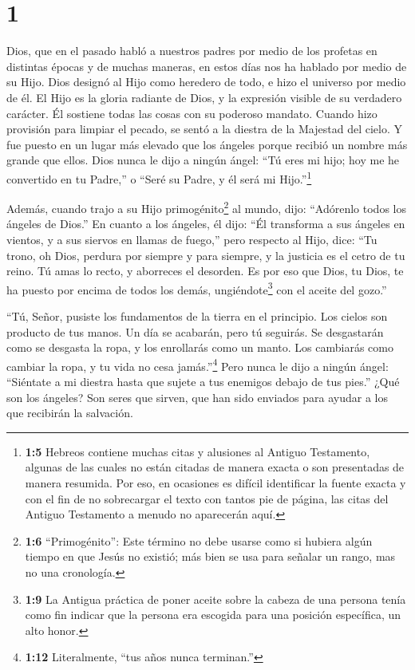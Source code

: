 \hypertarget{section}{%
\section{1}\label{section}}

 Dios, que en el pasado habló a nuestros padres por medio de
los profetas en distintas épocas y de muchas maneras,  en
estos días nos ha hablado por medio de su Hijo. Dios designó al Hijo
como heredero de todo, e hizo el universo por medio de él. 
El Hijo es la gloria radiante de Dios, y la expresión visible de su
verdadero carácter. Él sostiene todas las cosas con su poderoso mandato.
Cuando hizo provisión para limpiar el pecado, se sentó a la diestra de
la Majestad del cielo.  Y fue puesto en un lugar más elevado
que los ángeles porque recibió un nombre más grande que ellos.
 Dios nunca le dijo a ningún ángel: ``Tú eres mi hijo; hoy
me he convertido en tu Padre,'' o ``Seré su Padre, y él será mi
Hijo.''\footnote{\textbf{1:5} Hebreos contiene muchas citas y alusiones
  al Antiguo Testamento, algunas de las cuales no están citadas de
  manera exacta o son presentadas de manera resumida. Por eso, en
  ocasiones es difícil identificar la fuente exacta y con el fin de no
  sobrecargar el texto con tantos pie de página, las citas del Antiguo
  Testamento a menudo no aparecerán aquí.}

 Además, cuando trajo a su Hijo primogénito\footnote{\textbf{1:6}
  ``Primogénito'': Este término no debe usarse como si hubiera algún
  tiempo en que Jesús no existió; más bien se usa para señalar un rango,
  mas no una cronología.} al mundo, dijo: ``Adórenlo todos los ángeles
de Dios.''  En cuanto a los ángeles, él dijo: ``Él
transforma a sus ángeles en vientos, y a sus siervos en llamas de
fuego,''  pero respecto al Hijo, dice: ``Tu trono, oh Dios,
perdura por siempre y para siempre, y la justicia es el cetro de tu
reino.  Tú amas lo recto, y aborreces el desorden. Es por
eso que Dios, tu Dios, te ha puesto por encima de todos los demás,
ungiéndote\footnote{\textbf{1:9} La Antigua práctica de poner aceite
  sobre la cabeza de una persona tenía como fin indicar que la persona
  era escogida para una posición específica, un alto honor.} con el
aceite del gozo.''

 ``Tú, Señor, pusiste los fundamentos de la tierra en el
principio. Los cielos son producto de tus manos.  Un día se
acabarán, pero tú seguirás. Se desgastarán como se desgasta la ropa,
 y los enrollarás como un manto. Los cambiarás como cambiar
la ropa, y tu vida no cesa jamás.''\footnote{\textbf{1:12} Literalmente,
  ``tus años nunca terminan.''}  Pero nunca le dijo a
ningún ángel: ``Siéntate a mi diestra hasta que sujete a tus enemigos
debajo de tus pies.''  ¿Qué son los ángeles? Son seres que
sirven, que han sido enviados para ayudar a los que recibirán la
salvación.

